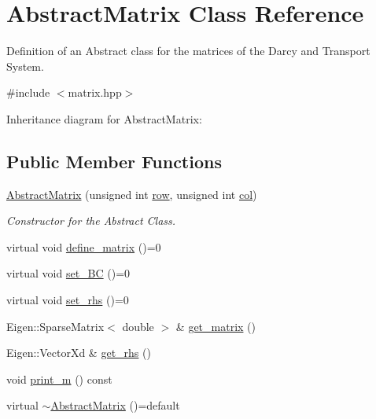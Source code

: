 \hypertarget{classAbstractMatrix}{}\section{Abstract\+Matrix Class Reference}
\label{classAbstractMatrix}


Definition of an Abstract class for the matrices of the Darcy and Transport System.  




{\ttfamily \#include $<$matrix.\+hpp$>$}



Inheritance diagram for Abstract\+Matrix\+:
\subsection*{Public Member Functions}
\begin{DoxyCompactItemize}
\item 
\hyperlink{classAbstractMatrix_ace76e143b5a5225394ad333d3b1aa1bf}{Abstract\+Matrix} (unsigned int \hyperlink{classAbstractMatrix_a27fb46bf2853d4927d92a81b8b7773fb}{row}, unsigned int \hyperlink{classAbstractMatrix_af3ad3551ce094979488cef5df0e4fc1d}{col})
\begin{DoxyCompactList}\small\item\em Constructor for the Abstract Class. \end{DoxyCompactList}\item 
virtual void \hyperlink{classAbstractMatrix_a40016da151226fbfcd444839943d8fe3}{define\+\_\+matrix} ()=0
\item 
virtual void \hyperlink{classAbstractMatrix_aa0a17dacbeede4180531b115d4a9f3eb}{set\+\_\+\+BC} ()=0
\item 
virtual void \hyperlink{classAbstractMatrix_a1334661de25f76dc65f16538c167a03c}{set\+\_\+rhs} ()=0
\item 
Eigen\+::\+Sparse\+Matrix$<$ double $>$ \& \hyperlink{classAbstractMatrix_a9fd2d0c61c8f8cd0f272a5649ca0d043}{get\+\_\+matrix} ()
\item 
Eigen\+::\+Vector\+Xd \& \hyperlink{classAbstractMatrix_aa47f7f7fee3465e4d750538f27485a7e}{get\+\_\+rhs} ()
\item 
void \hyperlink{classAbstractMatrix_a68df381d8ccd85e8cdd74302a4baa21b}{print\+\_\+m} () const
\item 
virtual \hyperlink{classAbstractMatrix_ae04267719092a2174faa32054fdf079e}{$\sim$\+Abstract\+Matrix} ()=default
\end{DoxyCompactItemize}
